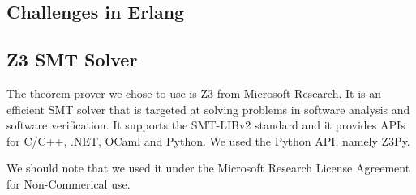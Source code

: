 \subsection{Challenges in Erlang}\label{subsec:concolic_chalenges_in_erlang}

\subsection{Z3 SMT Solver}\label{subsec:z3_smt_solver}

The theorem prover we chose to use is Z3 from Microsoft Research. It is an 
efficient SMT solver that is targeted at solving problems in software analysis 
and software verification. It supports the SMT-LIBv2 standard and it provides 
APIs for C/C++, .NET, OCaml and Python. We used the Python API, namely Z3Py.

We should note that we used it under the Microsoft Research License Agreement for 
Non-Commerical use.


